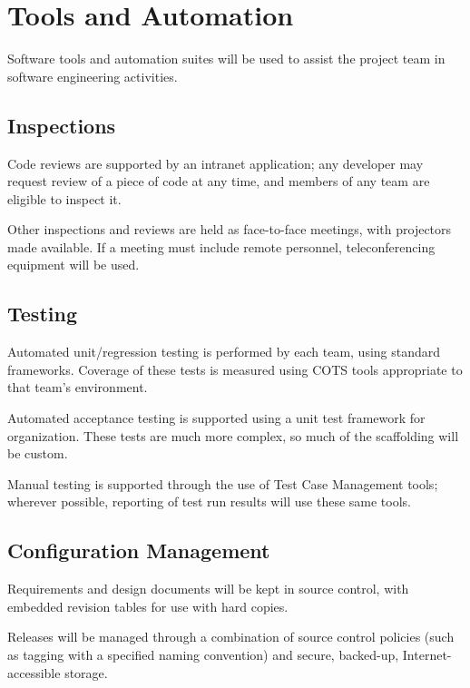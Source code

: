 \documentclass[11pt]{wacomepd}
\begin{document}
\chapter{Tools and Automation}

Software tools and automation suites will be used to assist the project team in software engineering
activities.

\section{Inspections}
Code reviews are supported by an intranet application; any developer may request review of a
piece of code at any time, and members of any team are eligible to inspect it.

Other inspections and reviews are held as face-to-face meetings, with projectors made available.  If
a meeting must include remote personnel, teleconferencing equipment will be used.


\section{Testing}
Automated unit/regression testing is performed by each team, using standard frameworks.  Coverage of
these tests is measured using COTS tools appropriate to that team's environment.

Automated acceptance testing is supported using a unit test framework for organization.  These tests
are much more complex, so much of the scaffolding will be custom.

Manual testing is supported through the use of Test Case Management tools; wherever possible,
reporting of test run results will use these same tools.

\section{Configuration Management}
Requirements and design documents will be kept in source control, with embedded revision tables for
use with hard copies.

Releases will be managed through a combination of source control policies (such as tagging with a
specified naming convention) and secure, backed-up, Internet-accessible storage.
\end{document}
